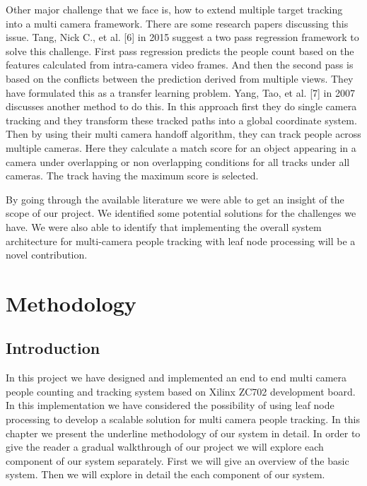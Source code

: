 \documentclass[12pt,a4paper]{report}
\begin{document}
Other major challenge that we face is, how to extend multiple target tracking into a multi camera framework. There are some research papers discussing this issue. Tang, Nick C., et al. [6] in 2015 suggest a two pass regression framework to solve this challenge. First pass regression predicts the people count based on the features calculated from intra-camera video frames. And then the second pass is based on the conflicts between the prediction derived from multiple views. They have formulated this as a transfer learning problem. Yang, Tao, et al. [7] in 2007 discusses another method to do this. In this approach first they do single camera tracking and they transform these tracked paths into a global coordinate system. Then by using their multi camera handoff algorithm, they can track people across multiple cameras. Here they calculate a match score for an object appearing in a camera under overlapping or non overlapping conditions for all tracks under all cameras. The track having the maximum score is selected.\vspace{0.3cm}

By going through the available literature we were able to get an insight of the scope of our project. We identified some potential solutions for the challenges we have. We were also able to identify that implementing the overall system architecture for multi-camera people tracking with leaf node processing will be a novel contribution. 



\chapter{Methodology}
\section{Introduction}
In this project we have designed and implemented an end to end multi camera people counting and tracking system based on Xilinx ZC702 development board. In this implementation we have considered the possibility of using leaf node processing to develop a scalable solution for multi camera people tracking. In this chapter we present the underline methodology of our system in detail.
In order to give the reader a gradual walkthrough of our project we will explore each component of our system separately. First we will give an overview of the basic system. Then we will explore in detail the each component of our system. 
\end{document}
